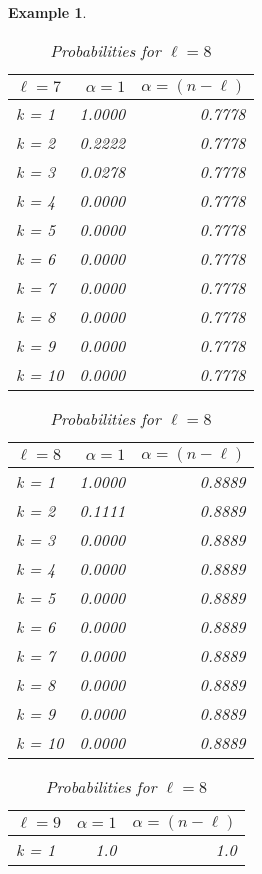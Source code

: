\documentclass{article}
\newtheorem{example}{Example} %
\begin{document}
\begin{example}
\begin{table}[H]
\begin{minipage}{0.33\textwidth}
\small
\begin{tabular}{lrr}
\hline
$\ell=7$ & $\alpha = 1$ & $\alpha = (n-\ell)$ \\
\hline
k = 1  &     1.0000 &         0.7778 \\
k = 2  &     0.2222 &         0.7778 \\
k = 3  &     0.0278 &         0.7778 \\
k = 4  &     0.0000 &         0.7778 \\
k = 5  &     0.0000 &         0.7778 \\
k = 6  &     0.0000 &         0.7778 \\
k = 7  &     0.0000 &         0.7778 \\
k = 8  &     0.0000 &         0.7778 \\
k = 9  &     0.0000 &         0.7778 \\
k = 10 &     0.0000 &         0.7778 \\
\hline
\end{tabular}
\caption{Probabilities for $\ell=7$}
\end{minipage}\hfill
\centering
\begin{minipage}{0.33\textwidth}
\small
\begin{tabular}{lrr}
\hline
$\ell=8$ & $\alpha = 1$ & $\alpha = (n-\ell)$ \\
\hline
k = 1  &     1.0000 &         0.8889 \\
k = 2  &     0.1111 &         0.8889 \\
k = 3  &     0.0000 &         0.8889 \\
k = 4  &     0.0000 &         0.8889 \\
k = 5  &     0.0000 &         0.8889 \\
k = 6  &     0.0000 &         0.8889 \\
k = 7  &     0.0000 &         0.8889 \\
k = 8  &     0.0000 &         0.8889 \\
k = 9  &     0.0000 &         0.8889 \\
k = 10 &     0.0000 &         0.8889 \\
\hline
\end{tabular}
\caption{Probabilities for $\ell=8$}
\end{minipage}\hfill
\centering
\begin{minipage}{0.33\textwidth}
\small
\begin{tabular}{lrr}
\hline
$\ell=9$ & $\alpha = 1$ & $\alpha = (n-\ell)$ \\
\hline
k = 1  &        1.0 &            1.0 \\

\end{tabular}
\end{minipage}
\end{table}
\end{example}
\end{document}
